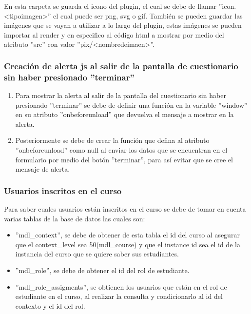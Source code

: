 			En esta carpeta se guarda el icono del plugin, el cual se debe de llamar ''icon.<tipoimagen>'' el cual puede ser png, svg o gif.
			También se pueden guardar las imágenes que se vayan a utilizar a lo largo del plugin, estas imágenes se pueden importar al render y en especifico al código html a mostrar por medio del atributo ''src'' con valor ''pix/<nombredeimaen>''.

	\subsubsection{Creación de alerta js al salir de la pantalla de cuestionario sin haber presionado ''terminar''}

    \begin{enumerate}
      \item Para mostrar la alerta al salir de la pantalla del cuestionario sin haber presionado ''terminar'' se debe de definir una función en la variable ''window'' en su atributo ''onbeforeunload'' que devuelva el mensaje a mostrar en la alerta.
      \item Posteriormente se debe de crear la función que defina al atributo ''onbeforeunload'' como null al enviar los datos que se encuentran en el formulario por medio del botón ''terminar'', para así evitar que se cree el mensaje de alerta.
    \end{enumerate}


  \subsubsection{Usuarios inscritos en el curso}
		Para saber cuales usuarios están inscritos en el curso se debe de tomar en cuenta varias tablas de la base de datos las cuales son:
    \begin{itemize}
      \item ''mdl\_context'', se debe de obtener de esta tabla el id del curso al asegurar que el context\_level sea 50(mdl\_course) y que el instance id sea el id de la instancia del curso que se quiere saber sus estudiantes.
      \item ''mdl\_role'', se debe de obtener el id del rol de estudiante.
      \item ''mdl\_role\_assigments'', se obtienen los usuarios que están en el rol de estudiante en el curso, al realizar la consulta y condicionarlo al id del contexto y el id del rol.
    \end{itemize}
